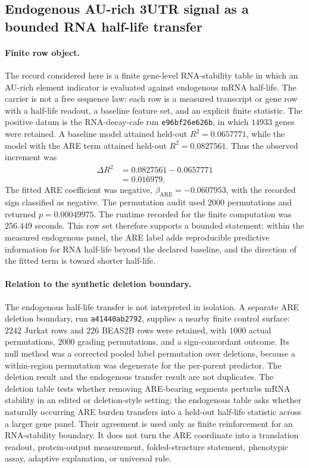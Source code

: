 
\subsection{Endogenous AU-rich 3UTR signal as a bounded RNA half-life transfer}
\label{sec:bioreality-are-endogenous-3utr-halflife-transfer-rnadecaycafe}

\paragraph{Finite row object.}
The record considered here is a finite gene-level RNA-stability table in which an AU-rich element indicator is evaluated against endogenous mRNA half-life.  The carrier is not a free sequence law: each row is a measured transcript or gene row with a half-life readout, a baseline feature set, and an explicit finite statistic.  The positive datum is the RNA-decay-cafe run \texttt{e96bf26e626b}, in which $14933$ genes were retained.  A baseline model attained held-out $R^2=0.0657771$, while the model with the ARE term attained held-out $R^2=0.0827561$.  Thus the observed increment was
$$
\begin{aligned}
\Delta R^2 &= 0.0827561-0.0657771 \\
           &= 0.016979 .
\end{aligned}
$$
The fitted ARE coefficient was negative, $\beta_{\mathrm{ARE}}=-0.0607953$, with the recorded sign classified as negative.  The permutation audit used $2000$ permutations and returned $p=0.00049975$.  The runtime recorded for the finite computation was $256.449$ seconds.  This row set therefore supports a bounded statement: within the measured endogenous panel, the ARE label adds reproducible predictive information for RNA half-life beyond the declared baseline, and the direction of the fitted term is toward shorter half-life.

\paragraph{Relation to the synthetic deletion boundary.}
The endogenous half-life transfer is not interpreted in isolation.  A separate ARE deletion boundary, run \texttt{a41440ab2792}, supplies a nearby finite control surface: $2242$ Jurkat rows and $226$ BEAS2B rows were retained, with $1000$ actual permutations, $2000$ grading permutations, and a sign-concordant outcome.  Its null method was a corrected pooled label permutation over deletions, because a within-region permutation was degenerate for the per-parent predictor.  The deletion result and the endogenous transfer result are not duplicates.  The deletion table tests whether removing ARE-bearing segments perturbs mRNA stability in an edited or deletion-style setting; the endogenous table asks whether naturally occurring ARE burden transfers into a held-out half-life statistic across a larger gene panel.  Their agreement is used only as finite reinforcement for an RNA-stability boundary.  It does not turn the ARE coordinate into a translation readout, protein-output measurement, folded-structure statement, phenotypic assay, adaptive explanation, or universal rule.

